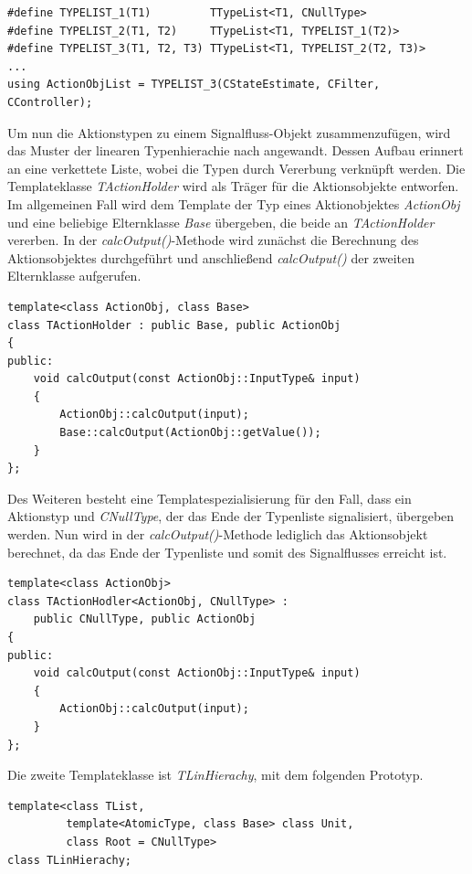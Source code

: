 \begin{lstlisting}[caption={Definition und Aufruf der Makros für verlängerte Typenlisten},captionpos=b]
#define TYPELIST_1(T1)         TTypeList<T1, CNullType>
#define TYPELIST_2(T1, T2) 	   TTypeList<T1, TYPELIST_1(T2)>
#define TYPELIST_3(T1, T2, T3) TTypeList<T1, TYPELIST_2(T2, T3)>
...
using ActionObjList = TYPELIST_3(CStateEstimate, CFilter, CController);
\end{lstlisting}
Um nun die Aktionstypen zu einem Signalfluss-Objekt zusammenzufügen, wird das Muster der linearen Typenhierachie nach \cite[S. 62 ff.]{ModernCpp} angewandt. Dessen Aufbau erinnert an eine verkettete Liste, wobei die Typen durch Vererbung verknüpft werden. Die Templateklasse \textit{TActionHolder} wird als Träger für die Aktionsobjekte entworfen.
Im allgemeinen Fall wird dem Template der Typ eines Aktionobjektes \textit{ActionObj} und eine beliebige Elternklasse \textit{Base} übergeben, die beide an \textit{TActionHolder} vererben. In der \textit{calcOutput()}-Methode wird zunächst die Berechnung des Aktionsobjektes durchgeführt und anschließend \textit{calcOutput()} der zweiten Elternklasse aufgerufen.
\begin{lstlisting}[caption={Templateklasse des Trägerobjektes},captionpos=b]
template<class ActionObj, class Base>
class TActionHolder : public Base, public ActionObj
{
public:
	void calcOutput(const ActionObj::InputType& input)
	{
		ActionObj::calcOutput(input);
		Base::calcOutput(ActionObj::getValue());
	}
};
\end{lstlisting}
Des Weiteren besteht eine Templatespezialisierung für den Fall, dass ein Aktionstyp und \textit{CNullType}, der das Ende der Typenliste signalisiert, übergeben werden. Nun wird in der \textit{calcOutput()}-Methode lediglich das Aktionsobjekt berechnet, da das Ende der Typenliste und somit des Signalflusses erreicht ist.
\begin{lstlisting}[caption={Templatespezialisierung des Trägerobjektes für das Ende der Typenliste},captionpos=b]
template<class ActionObj>
class TActionHodler<ActionObj, CNullType> : 
	public CNullType, public ActionObj
{
public:
	void calcOutput(const ActionObj::InputType& input)
	{
		ActionObj::calcOutput(input);
	}
};
\end{lstlisting}
Die zweite Templateklasse ist \textit{TLinHierachy}, mit dem folgenden Prototyp.
\begin{lstlisting}[caption={Deklaration der Templateklasse für lineare Hierarchien {\cite[S. 63]{ModernCpp}} },captionpos=b]
template<class TList,
         template<AtomicType, class Base> class Unit,
         class Root = CNullType>
class TLinHierachy;
\end{lstlisting} 

